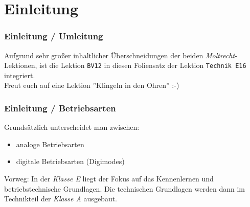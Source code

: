 

\subtitle{Technik Klasse E 16 \& Betriebstechnik/Vorschriften 12: \\
          (Digitale) Betriebsarten \\[2em]}
\date{Stand 03.05.2015}



\section{Einleitung}

\begin{frame}
    \frametitle{Einleitung / Umleitung}

    Aufgrund sehr großer inhaltlicher Überschneidungen der beiden
    \emph{Moltrecht}-Lektionen, ist die Lektion
    \texttt{BV12}\hyperlink{refs}{\cite{bv12}} in diesen Foliensatz der Lektion
    \texttt{Technik E16}\hyperlink{refs}{\cite{e16}} integriert. \\[2em]

    Freut euch auf eine Lektion ''Klingeln in den Ohren'' :-)

\end{frame}

\begin{frame}
    \frametitle{Einleitung / Betriebsarten}

    Grundsätzlich unterscheidet man zwischen:

    \begin{itemize}
		\item analoge Betriebsarten
		\item digitale Betriebsarten (Digimodes)
    \end{itemize}

    Vorweg: In der \emph{Klasse E} liegt der Fokus auf das Kennenlernen und
    betriebstechnische Grundlagen. Die technischen Grundlagen werden dann im
    Technikteil der \emph{Klasse A} ausgebaut.

\end{frame}

